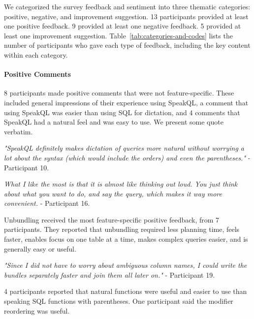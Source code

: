 \thematiccoding

We categorized the survey feedback and sentiment into three thematic categories: positive, negative, and improvement suggestion. 13 participants provided at least one positive feedback. 
9 provided at least one negative feedback. 5 provided at least one improvement suggestion. 
Table~\ref{tab:categories-and-codes} lists the number of participants who gave each type of feedback, including the key content within each category. 

\paragraph{\textbf{Positive Comments}} 
8 participants made positive comments that were not feature-specific. 
These included general impressions of their experience using SpeakQL, a comment that using SpeakQL was easier than using SQL for dictation, and 4 comments that SpeakQL had a natural feel and was easy to use.
We present some quote verbatim. 

\vspace{1mm}
\emph{"SpeakQL definitely makes dictation of queries more natural without worrying a lot about the syntax (which would include the orders) and even the parentheses."}
- Participant 10.

\vspace{1mm}
\emph{What I like the most is that it is almost like thinking out loud. You just think about what you want to do, and say the query, which makes it way more convenient.}
- Participant 16.

\vspace{1mm}
Unbundling received the most feature-specific positive feedback, from 7 participants. 
They reported that unbundling required less planning time, feels faster, enables focus on one table at a time, makes complex queries easier, and is generally easy or useful.

\vspace{1mm}
\emph{"Since I did not have to worry about ambiguous column names, I could write the bundles separately faster and join them all later on."}
- Participant 19.

\vspace{1mm}
4 participants reported that natural functions were useful and easier to use than speaking SQL functions with parentheses. One participant said the modifier reordering was useful.


